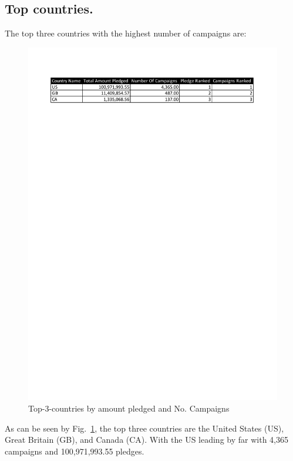 \documentclass{article}
\begin{document}
\medskip
\subsection{Top countries.}

The top three countries with the highest number of campaigns are:

\medskip

\begin{figure}[h]
\begin{center}
\includegraphics[width= 12 cm]{top-three-countries.pdf}
\end{center}
\caption{\label{fig:top-three-countries}  Top-3-countries by amount pledged and No. Campaigns}
\end{figure}

\noindent  As can be seen by Fig.~\ref{fig:top-three-countries}, the top three countries are the United States (US), Great Britain (GB), and Canada (CA).  With the US leading by far with 4,365 campaigns and 100,971,993.55 pledges. 
\end{document}
